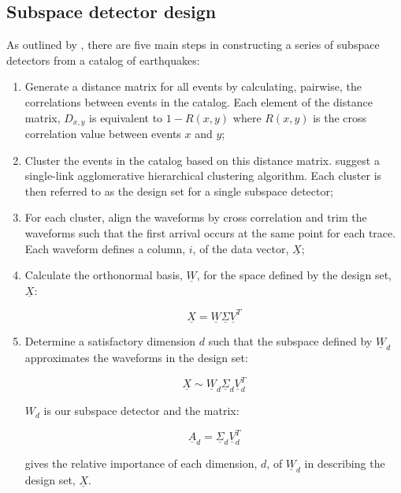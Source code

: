 \subsection{Subspace detector design}
As outlined by \citet{Harris_2006a}, there are five main steps in constructing a series of subspace detectors from a catalog of earthquakes:
\begin{enumerate}
    \item Generate a distance matrix for all events by calculating, pairwise, the correlations between events in the catalog. Each element of the distance matrix, $D_{x, y}$ is equivalent to $1 - R(x, y)$ where $R(x, y)$ is the cross correlation value between events $x$ and $y$;
    \item Cluster the events in the catalog based on this distance matrix. \citet{Harris_2006a} suggest a single-link agglomerative hierarchical clustering algorithm. Each cluster is then referred to as the design set for a single subspace detector;
    \item For each cluster, align the waveforms by cross correlation and trim the waveforms such that the first arrival occurs at the same point for each trace. Each waveform defines a column, $i$, of the data vector, $\underline{X}$;
    \item Calculate the orthonormal basis, $\underline{W}$, for the space defined by the design set, $\underline{X}$:

    \begin{equation}
    \underline{X} = \underline{W} \underline{\Sigma} \underline{V}^{T}
    \end{equation}
    
    \item Determine a satisfactory dimension $d$ such that the subspace defined by $\underline{W}_{d}$ approximates the waveforms in the design set:
    
    \begin{equation}
    \underline{X} \sim \underline{W}_{d} \underline{\Sigma}_{d} \underline{V}_{d}^{T}
    \end{equation}
    
    $W_{d}$ is our subspace detector and the matrix:
    
    \begin{equation}
    \underline{A}_{d} = \underline{\Sigma}_{d}\underline{V}_{d}^{T}
    \end{equation}
    
    gives the relative importance of each dimension, $d$, of $\underline{W}_{d}$ in describing the design set, $\underline{X}$.
\end{enumerate}

